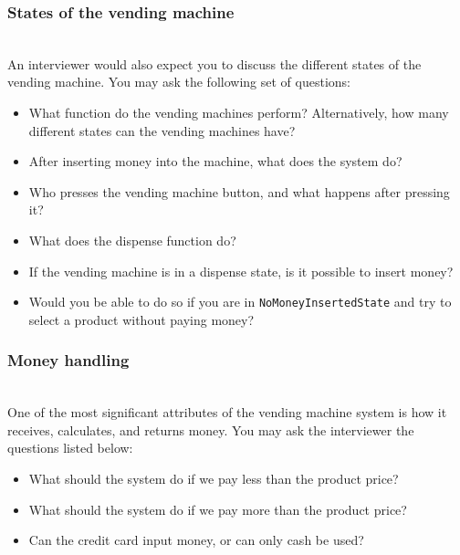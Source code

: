 \subsubsection{States of the vending machine}\label{TD9m6aoJkytD60xyfKeL8}
\\
An interviewer would also expect you to discuss the different states of the vending machine. You may ask the following set of questions:

\begin{itemize}
\item
\protect{}\label{LBPLTCOPU03jxmJ3q2wV7}
What function do the vending machines perform? Alternatively, how many different states can the vending machines have?
\item
\protect{}\label{P4embIsIxWZgyUctHixbT}
After inserting money into the machine, what does the system do?
\item
\protect{}\label{D6JbCgAVnqpuEotfTd-DS}
Who presses the vending machine button, and what happens after pressing it?
\item
\protect{}\label{JTV97fE65p8vkYO_c8B6s}
What does the dispense function do?
\item
\protect{}\label{0sywcpNrH0hF3bb_iFaeD}
If the vending machine is in a dispense state, is it possible to insert money?
\item
\protect{}\label{OPg7-KcxG_AwY52-PJqX4}
Would you be able to do so if you are in \texttt{NoMoneyInsertedState} and try to select a product without paying money?
\end{itemize}

\subsubsection{Money handling}\label{h8xGXtXWjbANX6KBcLfOe}
\\
One of the most significant attributes of the vending machine system is how it receives, calculates, and returns money. You may ask the interviewer the questions listed below:

\begin{itemize}
\item
\protect{}\label{vdajue9mAbgTTeD8N1KDj}
What should the system do if we pay less than the product price?
\item
\protect{}\label{aCxu9BOB7SdgVOafQGDUh}
What should the system do if we pay more than the product price?
\item
\protect{}\label{Rpnf-VBYID6TRHXyyNUMu}
Can the credit card input money, or can only cash be used?
\end{itemize}

